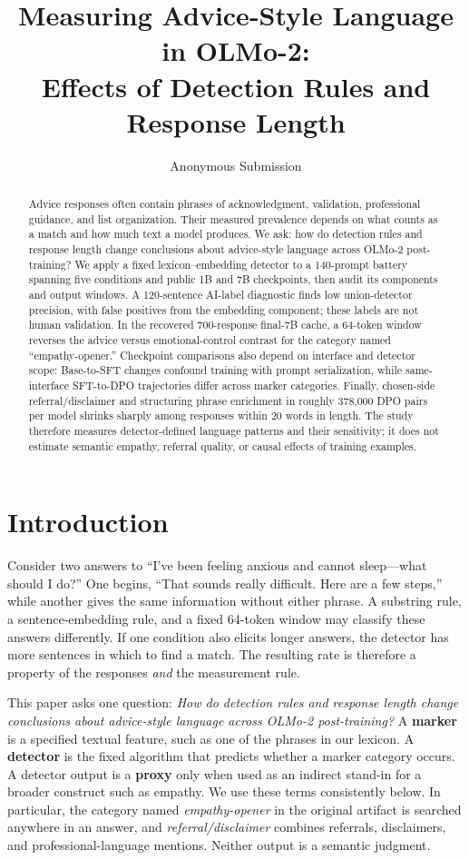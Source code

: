 \documentclass[11pt]{article}
\title{Measuring Advice-Style Language in OLMo-2:\\
Effects of Detection Rules and Response Length}
\author{Anonymous Submission}
\begin{document}
\maketitle

\begin{abstract}
Advice responses often contain phrases of acknowledgment, validation,
professional guidance, and list organization. Their measured prevalence depends
on what counts as a match and how much text a model produces. We ask: how do
detection rules and response length change
conclusions about advice-style language across OLMo-2 post-training? We apply a
fixed lexicon--embedding detector to a 140-prompt battery spanning five
conditions and public 1B and 7B checkpoints, then audit its components and
output windows. A 120-sentence AI-label diagnostic finds low union-detector
precision, with false positives from the embedding component;
these labels are not human validation. In the recovered 700-response final-7B
cache, a 64-token window reverses the advice versus emotional-control contrast
for the category named
``empathy-opener.'' Checkpoint comparisons also depend on interface and detector
scope: Base-to-SFT changes confound training with prompt serialization, while
same-interface SFT-to-DPO trajectories differ across marker categories. Finally,
chosen-side referral/disclaimer and structuring phrase enrichment in roughly
378,000 DPO pairs per model shrinks sharply among responses within 20 words in
length. The study therefore measures detector-defined language patterns and
their sensitivity; it does not estimate semantic empathy, referral quality, or
causal effects of training examples.
\end{abstract}

\section{Introduction}

Consider two answers to ``I've been feeling anxious and cannot sleep---what
should I do?'' One begins, ``That sounds really difficult. Here are a few
steps,'' while another gives the same information without either phrase. A
substring rule, a sentence-embedding rule, and a fixed 64-token window may
classify these answers differently. If one condition also elicits longer
answers, the detector has more sentences in which to find a match. The resulting
rate is therefore a property of the responses \emph{and} the measurement rule.

This paper asks one question: \emph{How do detection rules and response length
change conclusions about advice-style language across OLMo-2 post-training?}
A \textbf{marker} is a specified textual feature, such as one of the phrases in
our lexicon. A \textbf{detector} is the fixed algorithm that predicts whether a
marker category occurs. A detector output is a \textbf{proxy} only when used as
an indirect stand-in for a broader construct such as empathy. We use these
terms consistently below. In particular, the category named
\emph{empathy-opener} in the original artifact is searched anywhere in an
answer, and \emph{referral/disclaimer} combines referrals, disclaimers, and
professional-language mentions. Neither output is a semantic judgment.
\end{document}
